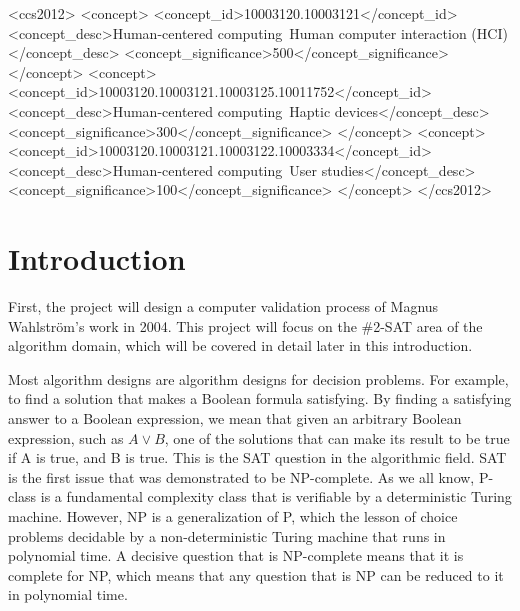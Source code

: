 \documentclass{sigchi}
\def\plainkeywords{\#SAT; \#2SAT; graph theory; complexity theory}
\begin{document}

\begin{CCSXML}
<ccs2012>
<concept>
<concept_id>10003120.10003121</concept_id>
<concept_desc>Human-centered computing~Human computer interaction (HCI)</concept_desc>
<concept_significance>500</concept_significance>
</concept>
<concept>
<concept_id>10003120.10003121.10003125.10011752</concept_id>
<concept_desc>Human-centered computing~Haptic devices</concept_desc>
<concept_significance>300</concept_significance>
</concept>
<concept>
<concept_id>10003120.10003121.10003122.10003334</concept_id>
<concept_desc>Human-centered computing~User studies</concept_desc>
<concept_significance>100</concept_significance>
</concept>
</ccs2012>
\end{CCSXML}


\keywords{\plainkeywords}





\section{Introduction}
First, the project will design a computer validation process of Magnus Wahlström's work in 2004.\cite{10.1016/j.tcs.2004.10.037} This project will focus on the \#2-SAT area of the algorithm domain, which will be covered in detail later in this introduction.

Most algorithm designs are algorithm designs for decision problems. For example, to find a solution that makes a Boolean formula satisfying. By finding a satisfying answer to a Boolean expression, we mean that given an arbitrary Boolean expression, such as $A \vee B $, one of the solutions that can make its result to be true if A is true, and B is true. This is the SAT question in the algorithmic field. SAT is the first issue that was demonstrated to be NP-complete.\cite{10.1145/800157.805047} As we all know, P-class is a fundamental complexity class that is verifiable by a deterministic Turing machine. However, NP is a generalization of P, which the lesson of choice problems decidable by a non-deterministic Turing machine that runs in polynomial time. A decisive question that is NP-complete means that it is complete for NP, which means that any question that is NP can be reduced to it in polynomial time.
\end{document}
